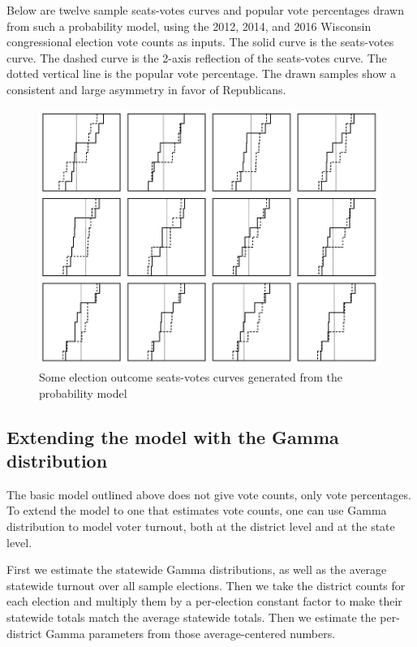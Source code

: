 \documentclass[preprint,12pt]{article}
\begin{document}
Below are twelve sample seats-votes curves and popular vote percentages drawn from such a probability model, using the 2012, 2014, and 2016 Wisconsin congressional election vote counts as inputs.  The solid curve is the seats-votes curve.  The dashed curve is the 2-axis reflection of the seats-votes curve.  The dotted vertical line is the popular vote percentage.  The drawn samples show a consistent and large asymmetry in favor of Republicans.

\begin{figure}[htb!]
    \begin{center}
        \includegraphics[scale=0.6]{../Figures/WI2010/sv_curves_congress.png}
        \caption{Some election outcome seats-votes curves generated from the probability model}\label{fig:SVCongress}
    \end{center}
\end{figure}
 
\subsection{Extending the model with the Gamma distribution}
 
The basic model outlined above does not give vote counts, only vote percentages.  To extend the model to one that estimates vote counts, one can use Gamma distribution to model voter turnout, both at the district level and at the state level.
 
First we estimate the statewide Gamma distributions, as well as the average statewide turnout over all sample elections.   Then we take the district counts for each election and multiply them by a per-election constant factor to make their statewide totals match the average statewide totals.  Then we estimate the per-district Gamma parameters from those average-centered numbers.
 
\end{document}
